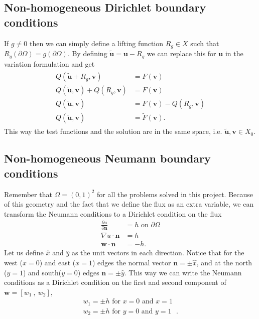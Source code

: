 \subsection{Non-homogeneous Dirichlet boundary conditions}
If $g \neq 0$ then we can simply define a lifting function $R_g \in X$ such that $R_g(\partial \Omega) = g(\partial \Omega)$. By defining $\tilde{\mathbf{u}}=\mathbf{u}-R_g$ we can replace this for $\mathbf{u}$ in the variation formulation and get 
\begin{align}
	\begin{split}
	Q(\tilde{\mathbf{u}}+R_g,\mathbf{v}) &= F(\mathbf{v}) \\
	Q(\tilde{\mathbf{u}},\mathbf{v})+Q(R_g,\mathbf{v}) &= F(\mathbf{v}) \\
	Q(\tilde{\mathbf{u}},\mathbf{v}) &= F(\mathbf{v}) - Q(R_g,\mathbf{v})\\
	Q(\tilde{\mathbf{u}},\mathbf{v}) &= \tilde{F}(\mathbf{v}).
	\end{split}
	\label{eq:liftingFunc}
\end{align}
%
This way the test functions and the solution are in the same space, i.e. $\mathbf{\tilde u}, \mathbf{v} \in X_0$.
\subsection{Non-homogeneous Neumann boundary conditions}
Remember that $\Omega = (0,1)^2$ for all the problems solved in this project. Because of this geometry and the fact that we define the flux as an extra variable, we can transform the Neumann conditions to a Dirichlet condition on the flux 
\begin{align}
	\frac{\partial u}{\partial \mathbf{n}} &= h \text{  on   } \partial \Omega \\
	\nabla u \cdot \mathbf{n} &= h \\
	 \mathbf{w} \cdot \mathbf{n} &= -h. 
	\label{eq:neumann}
\end{align}
Let us define $\hat{x}$ and $\hat{y}$ as the unit vectors in each direction. Notice that for the west ($x=0$) and east ($x=1$) edges the normal vector $\mathbf{n}= \pm\hat{x}$, and at the north ($y=1$) and south($y=0$) edges $\mathbf{n}=\pm \hat{y}$. This way we can write the Neumann conditions as a Dirichlet condition on the first and second component of $\mathbf{w}= [ w_1 \:,\: w_2]$, 
\begin{align}
	w_1 = \pm h \text{    for $x = 0$ and $x=1$ }\\
	w_2 = \pm h \text{    for $y = 0$ and $y=1$ }.
	\label{eq:neumannAsDirichlet}
\end{align}
